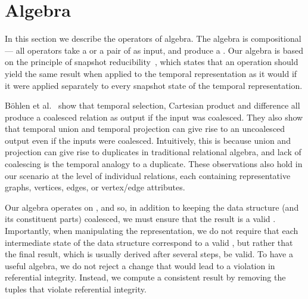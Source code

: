 \section{Algebra}
\label{sec:algebra}
\setlength{\textfloatsep}{5pt}%

In this section we describe the operators of \tg algebra.  The algebra
is compositional --- all operators take a \tg or a pair of \tgs as
input, and produce a \tg.  Our algebra is based on the principle of
snapshot reducibility~\cite{DBLP:reference/db/Bohlen092}, which states
that an operation should yield the same result when applied to the
temporal representation as it would if it were applied separately to
every snapshot state of the temporal representation.


B\"ohlen et al.~\cite{DBLP:conf/vldb/BohlenSS96} show that temporal
selection, Cartesian product and difference all produce a coalesced
relation as output if the input was coalesced.  They also show that
temporal union and temporal projection can give rise to an uncoalesced
output even if the inputs were coalesced.  Intuitively, this is
because union and projection can give rise to duplicates in
traditional relational algebra, and lack of coalescing is the temporal
analogy to a duplicate.
%
These observations also hold in our scenario at the level of
individual relations, each containing representative graphs, vertices,
edges, or vertex/edge attributes.

Our algebra operates on \tgs, and so, in addition to keeping the data
structure (and its constituent parts) coalesced, we must ensure that
the result is a valid \tg.  Importantly, when manipulating the \ve
representation, we do not require that each intermediate state of the
data structure correspond to a valid \tg, but rather that the final
result, which is usually derived after several steps, be valid.  To
have a useful algebra, we do not reject a change that would lead to a
violation in referential integrity.  Instead, we compute a consistent
result by removing the tuples that violate referential integrity.

